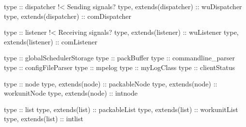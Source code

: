 type :: dispatcher !< Sending signals?
  type, extends(dispatcher) :: wuDispatcher
  type, extends(dispatcher) :: comDispatcher

type :: listener !< Receiving signals?
  type, extends(listener) :: wuListener
  type, extends(listener) :: comListener

type :: globalSchedulerStorage
type :: packBuffer
type :: commandline_parser
type :: configFileParser
type :: mpelog
type :: myLogClass
type :: clientStatus

type :: node
  type, extends(node) :: packableNode
  type, extends(node) :: workunitNode
  type, extends(node) :: intnode

type :: list
  type, extends(list) :: packableList
  type, extends(list) :: workunitList
  type, extends(list) :: intlist
